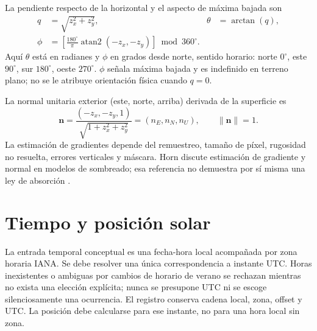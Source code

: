 \documentclass[11pt,a4paper]{article}
\begin{document}
La pendiente respecto de la horizontal y el aspecto de máxima bajada son
\begin{align}
 q&=\sqrt{z_x^2+z_y^2}, & \theta&=\arctan(q),\label{eq:slope}\\
 \phi&=\left[\frac{180^\circ}{\pi}\operatorname{atan2}(-z_x,-z_y)\right]\bmod 360^\circ.\label{eq:aspect}
\end{align}
Aquí $\theta$ está en radianes y $\phi$ en grados desde norte, sentido horario: norte $0^\circ$, este $90^\circ$, sur $180^\circ$, oeste $270^\circ$. $\phi$ señala máxima bajada y es indefinido en terreno plano; no se le atribuye orientación física cuando $q=0$.

La normal unitaria exterior (este, norte, arriba) derivada de la superficie es
\begin{equation}
 \mathbf n=\frac{(-z_x,-z_y,1)}{\sqrt{1+z_x^2+z_y^2}}=(n_E,n_N,n_U),\qquad\|\mathbf n\|=1.\label{eq:normal}
\end{equation}
La estimación de gradientes depende del remuestreo, tamaño de píxel, rugosidad no resuelta, errores verticales y máscara. Horn discute estimación de gradiente y normal en modelos de sombreado; esa referencia no demuestra por sí misma una ley de absorción \cite{horn1981}.

\section{Tiempo y posición solar}
La entrada temporal conceptual es una fecha-hora local acompañada por zona horaria IANA. Se debe resolver una única correspondencia a instante UTC. Horas inexistentes o ambiguas por cambios de horario de verano se rechazan mientras no exista una elección explícita; nunca se presupone UTC ni se escoge silenciosamente una ocurrencia. El registro conserva cadena local, zona, offset y UTC. La posición debe calcularse para ese instante, no para una hora local sin zona.
\end{document}
